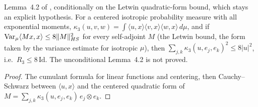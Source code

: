 \begin{lemma}
  \label{lem:bkl-third-cumulant-conditional}
  \leanok
  Lemma~4.2 of \cite{BizeulKlartagLehec2026}, conditionally on the Letwin quadratic-form bound, which
  stays an explicit hypothesis.  For a centered isotropic probability measure with all exponential
  moments, $\kappa_3(u,v,w)=\int\langle u,x\rangle\langle v,x\rangle\langle w,x\rangle\,d\mu$, and if
  $\mathrm{Var}_\mu\langle Mx,x\rangle\le8\lVert M\rVert_{HS}^2$ for every self-adjoint $M$ (the Letwin bound, the
form taken by the variance estimate for isotropic $\mu$), then
  $\sum_{j,k}\kappa_3(u,e_j,e_k)^2\le 8|u|^2$, i.e.\ $R_3\le8\,\mathrm{Id}$.  The unconditional Lemma~4.2 is
  not proved.
\end{lemma}
\begin{proof}
  \leanok
  The cumulant formula for linear functions and centering, then Cauchy--Schwarz between
  $\langle u,x\rangle$ and the centered quadratic form of $M=\sum_{j,k}\kappa_3(u,e_j,e_k)\,e_j\otimes e_k$.
\end{proof}

